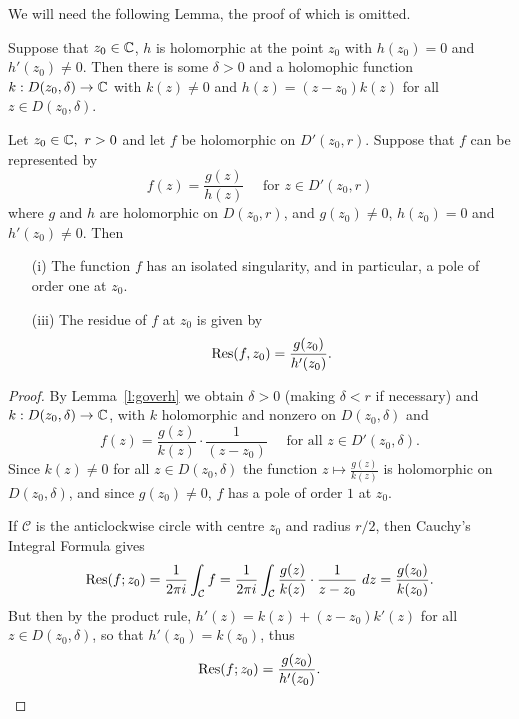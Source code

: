 We will need the following Lemma, the proof of which is omitted.
\begin{lemma}
\label{l:goverh}
Suppose that $z_0 \in \mathbb{C}$, $h$ is holomorphic at the point $z_0$ with $h(z_0)=0$ and $h'(z_0) \neq 0$.  Then there is some $\delta>0$ and a holomophic function $k:D(z_0,\delta) \to \mathbb{C}$ with $k(z) \neq 0$ and $h(z)=(z-z_0)k(z)$ for all $z \in D(z_0,\delta)$.
\end{lemma}
\begin{theorem}
\label{t:goverh}
Let $z_0 \in \mathbb{C},\ r>0$ and let $f$ be holomorphic on $D'(z_0,r)$. Suppose that $f$ can be represented by
\[
f(z) = \frac{g(z)}{h(z)}\quad \text{ for } z \in D'(z_0,r)
\]
where $g$ and $h$ are holomorphic on $D(z_0,r)$, and $g(z_0) \neq 0$, $h(z_0)=0$ and $h'(z_0) \neq 0$. Then
\begin{enumerate}
\item[(i)] The function $f$ has an isolated singularity, and in particular, a  pole of order one at $z_0$.
\item[(iii)] The residue of $f$ at $z_0$ is given by
\[
\mathrm{Res} (f,z_0) = \frac{g(z_0)}{h'(z_0)}.
\]
\end{enumerate}
\end{theorem}
\begin{proof}
By Lemma~\ref{l:goverh} we obtain $\delta>0$ (making $\delta<r$ if necessary) and $k:D(z_0,\delta)\to \mathbb{C}$, with $k$ holomorphic and nonzero on $D(z_0,\delta)$ and
\[
f(z)= \frac{g(z)}{k(z)}\cdot \frac{1}{(z-z_0)} \quad \text{ for all } z \in D'(z_0,\delta).
\]
Since $k(z) \neq 0$ for all $z \in D(z_0,\delta)$ the function $z \mapsto \frac{g(z)}{k(z)}$ is holomorphic on $D(z_0,\delta)$, and since $g(z_0) \neq 0$, $f$ has a pole of order $1$ at $z_0$.

If $\mathcal{C}$ is the anticlockwise circle with centre $z_0$ and radius $r/2$, then Cauchy's Integral Formula gives
\[
\mathrm{Res} (f;z_0) = \frac{1}{2\pi i} \int_{\mathcal{C}} f = \frac{1}{2\pi i} \int_{\mathcal{C}} \frac{g(z)}{k(z)} \cdot \frac{1}{z-z_0}\ dz = \frac{g(z_0)}{k(z_0)}.
\]
But then by the product rule, $h'(z) = k(z)+(z-z_0)k'(z)$ for all $z \in D(z_0,\delta)$, so that $h'(z_0) = k(z_0)$, thus
\[
\mathrm{Res} (f;z_0) = \frac{g(z_0)}{h'(z_0)}.
\]
\end{proof}


